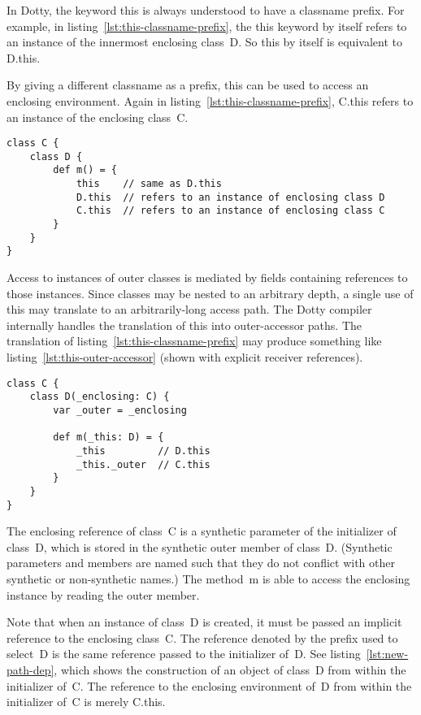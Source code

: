 In Dotty, the keyword {\cd this} is always understood to have a classname prefix. For example, in listing~\ref{lst:this-classname-prefix}, the {\cd this} keyword by itself refers to an instance of the innermost enclosing class~{\cd D}. So {\cd this} by itself is equivalent to \mbox{\cd D.this}.

By giving a different classname as a prefix, {\cd this} can be used to access an enclosing environment. Again in listing~\ref{lst:this-classname-prefix}, \mbox{\cd C.this} refers to an instance of the enclosing class~{\cd C}.

\begin{lstlisting}[float=htbp, caption={``This'' with Classname Prefix}, label={lst:this-classname-prefix}]
class C {
	class D {
		def m() = {
			this    // same as D.this
			D.this  // refers to an instance of enclosing class D
			C.this  // refers to an instance of enclosing class C
		}
	}
}
\end{lstlisting}

Access to instances of outer classes is mediated by fields containing references to those instances. Since classes may be nested to an arbitrary depth, a single use of {\cd this} may translate to an arbitrarily-long access path. The Dotty compiler internally handles the translation of {\cd this} into outer-accessor paths. The translation of listing~\ref{lst:this-classname-prefix} may produce something like listing~\ref{lst:this-outer-accessor} (shown with explicit receiver references).

\begin{lstlisting}[float=htbp, caption={``This'' to Outer-Accessor Path Translation}, label={lst:this-outer-accessor}]
class C {
	class D(_enclosing: C) {
		var _outer = _enclosing

		def m(_this: D) = {
			_this         // D.this
			_this._outer  // C.this
		}
	}
}
\end{lstlisting}

The {\cd \und enclosing} reference of class~{\cd C} is a synthetic parameter of the initializer of class~{\cd D}, which is stored in the synthetic {\cd \und outer} member of class~{\cd D}. (Synthetic parameters and members are named such that they do not conflict with other synthetic or non-synthetic names.) The method~{\cd m} is able to access the enclosing instance by reading the {\cd \und outer} member.

Note that when an instance of class~{\cd D} is created, it must be passed an implicit reference to the enclosing class~{\cd C}. The reference denoted by the prefix used to select~{\cd D} is the same reference passed to the initializer of~{\cd D}. See listing~\ref{lst:new-path-dep}, which shows the construction of an object of class~{\cd D} from within the initializer of~{\cd C}. The reference to the enclosing environment of~{\cd D} from within the initializer of~{\cd C} is merely \mbox{\cd C.this}.

